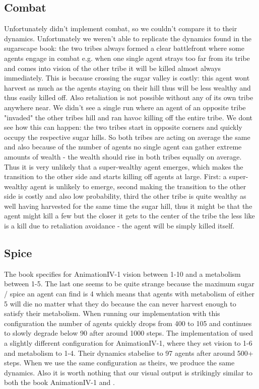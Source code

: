 \subsection{Combat}
Unfortunately \cite{weaver_replicating_nodate} didn't implement combat, so we couldn't compare it to their dynamics. Unfortunately we weren't able to replicate the dynamics found in the sugarscape book: the two tribes always formed a clear battlefront where some agents engage in combat e.g. when one single agent strays too far from its tribe and comes into vision of the other tribe it will be killed almost always immediately. This is because crossing the sugar valley is costly: this agent wont harvest as much as the agents staying on their hill thus will be less wealthy and thus easily killed off. Also retaliation is not possible without any of its own tribe anywhere near. 
We didn't see a single run where an agent of an opposite tribe "invaded" the other tribes hill and ran havoc killing off the entire tribe. We dont see how this can happen: the two tribes start in opposite corners and quickly occupy the respective sugar hills. So both tribes are acting on average the same and also because of the number of agents no single agent can gather extreme amounts of wealth - the wealth should rise in both tribes equally on average. Thus it is very unlikely that a super-wealthy agent emerges, which makes the transition to the other side and starts killing off agents at large. First: a super-wealthy agent is unlikely to emerge, second making the transition to the other side is costly and also low probability, third the other tribe is quite wealthy as well having harvested for the same time the sugar hill, thus it might be that the agent might kill a few but the closer it gets to the center of the tribe the less like is a kill due to retaliation avoidance - the agent will be simply killed itself.

\subsection{Spice}
The book specifies for AnimationIV-1 vision between 1-10 and a metabolism between 1-5. The last one seems to be quite strange because the maximum sugar / spice an agent can find is 4 which means that agents with metabolism of either 5 will die no matter what they do because the can never harvest enough to satisfy their metabolism. When running our implementation with this configuration the number of agents quickly drops from 400 to 105 and continues to slowly degrade below 90 after around 1000 steps.
The implementation of \cite{weaver_replicating_nodate} used a slightly different configuration for AnimationIV-1, where they set vision to 1-6 and metabolism to 1-4. Their dynamics stabelise to 97 agents after around 500+ steps. When we use the same configuration as theirs, we produce the same dynamics.
Also it is worth nothing that our visual output is strikingly similar to both the book AnimationIV-1 and \cite{weaver_replicating_nodate}.

